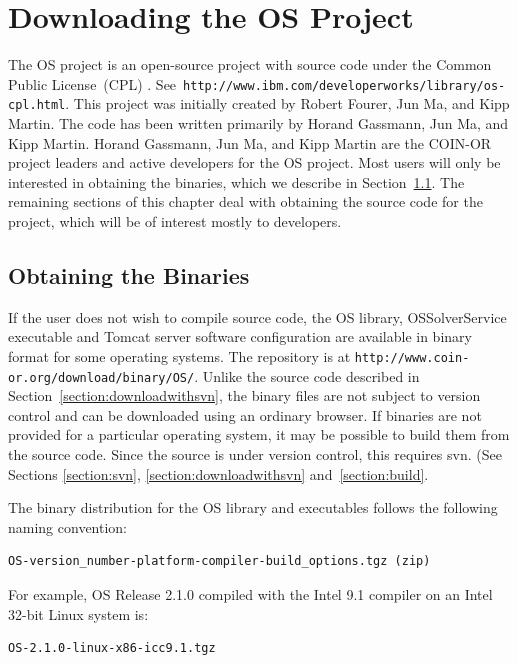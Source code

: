 \documentclass[11pt]{article}
\renewcommand{\_}{{\char"5F}}
\renewcommand{\{}{{\char"7B}}
\renewcommand{\}}{{\char"7D}}
\renewcommand{\^}{{\char"0D}}
\renewcommand{\'}{{\char"0D}}
\newcommand{\UrlCpl}{http://www.ibm.com/developerworks/library/os-cpl.html}
\newcommand{\UrlOsBinaries}{http://www.coin-or.org/download/binary/OS/}
\begin{document}
\section{Downloading the OS Project}\label{section:download}

The OS project is an open-source project  with source code under the Common Public License~(CPL)%
.
See~{\tt\UrlCpl}.  This project was initially created by Robert Fourer, Jun Ma, and Kipp Martin.
The code has been written primarily by  Horand Gassmann,   Jun Ma,  and Kipp Martin.    
Horand Gassmann,  Jun Ma,  and Kipp Martin are the COIN-OR project leaders and active developers for the OS project.
Most users will only be interested in obtaining the binaries, which we describe 
in Section~\ref{section:obtainingbinaries}. The remaining sections of this chapter deal with obtaining the 
source code for the project, which will be of interest mostly to developers.




\subsection{Obtaining the Binaries}\label{section:obtainingbinaries}

If the user does not wish to compile source code, the OS library, OSSolverService executable
and Tomcat server software configuration are available in binary format for some operating systems.     
The repository is at {\tt\UrlOsBinaries}. Unlike the source code described 
in Section~\ref{section:downloadwithsvn}, the binary files are not subject to version control and can be
downloaded using an ordinary browser. If binaries are not provided for a particular operating system,
it may be possible to build them from the source code. Since the source is under version control, 
this requires svn. (See Sections \ref{section:svn}, \ref{section:downloadwithsvn} and~\ref{section:build}.

The binary distribution for the OS library and executables follows the following naming convention:


\begin{verbatim}
OS-version_number-platform-compiler-build_options.tgz (zip)
\end{verbatim}
For example, OS  Release 2.1.0 compiled with the Intel 9.1 compiler on an Intel 32-bit Linux system is:
\begin{verbatim}
OS-2.1.0-linux-x86-icc9.1.tgz
\end{verbatim}
\end{document}
